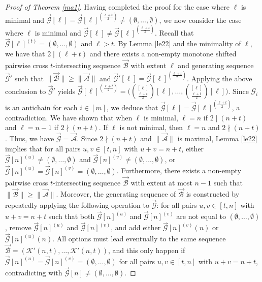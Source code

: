 \documentclass[11pt,a4paper]{article}
\begin{document}
\begin{proof}[Proof of Theorem \ref{ma1}]
Having completed the proof for the case where $\ell$ is minimal and $\vec{\mathcal{G}}[\ell]= \vec{\mathcal{G}}[\ell]^{(\frac{\ell+t}{2})}\neq (\emptyset,\ldots,\emptyset)$, we now consider the case where $\ell$ is minimal and $\vec{\mathcal{G}}[\ell]\neq \vec{\mathcal{G}}[\ell]^{(\frac{\ell+t}{2})}$.
Recall that $\vec{\mathcal{G}}[\ell]^{(t)}=(\emptyset,\ldots,\emptyset)$ and $\ell>t$. 
By Lemma \ref{le22} and the minimality of $\ell$, we have that $2\mid (\ell+t)$ and 
there exists a non-empty monotone shifted pairwise cross $t$-intersecting sequence $\vec{\mathcal{B}}$  with  extent $\ell$ and 
generating sequence $\vec{\mathcal{G}}'$ 
such that $\|\vec{\mathcal{B}}\|\geq \|\vec{\mathcal{A}}\|$ and $\vec{\mathcal{G}}'[\ell]= \vec{\mathcal{G}}[\ell]^{(\frac{\ell+t}{2})}$.
Applying the above conclusion to  $\vec{\mathcal{G}}'$ yields 
$\vec{\mathcal{G}}[\ell]^{(\frac{\ell+t}{2})}=\Big(\binom{[\ell]}{\frac{\ell+t}{2}}[\ell], \ldots,\binom{[\ell]}{\frac{\ell+t}{2}}[\ell] \Big)$.
Since $\mathcal{G}_i$ is an antichain for each $i\in [m]$, we deduce that $\vec{\mathcal{G}}[\ell]= \vec{\mathcal{G}}[\ell]^{(\frac{\ell+t}{2})}$, a contradiction.
We have shown that  when $\ell$ is minimal, $\ell=n$ if $2\mid (n+t)$ and $\ell=n-1$ if $2\nmid (n+t)$.
If $\ell$ is not minimal, then $\ell=n$ and $2\nmid (n+t)$.
Thus, we have $ \vec{\mathcal{G}}= \vec{\mathcal{A}}$.
Since $2\nmid (n+t)$ and $\|\vec{\mathcal{A}}\|$ is maximal, 
 Lemma \ref{le22} implies that  for all pairs $u, v\in [t,n]$ with  $u+v=n+t$, either $\vec{\mathcal{G}}[n]^{(u)}\neq (\emptyset,\ldots, \emptyset)$ and $\vec{\mathcal{G}}[n]^{(v)}\neq (\emptyset,\ldots, \emptyset)$, or $\vec{\mathcal{G}}[n]^{(u)}=\vec{\mathcal{G}}[n]^{(v)}=(\emptyset,\ldots, \emptyset)$. Furthermore, there exists a non-empty pairwise cross $t$-intersecting sequence $\vec{\mathcal{B}}$  with extent at most $n-1$  such that $\|\vec{\mathcal{B}}\|\geq \|\vec{\mathcal{A}}\|$.
Moreover,  the generating sequence of  $\vec{\mathcal{B}}$ is constructed by repeatedly applying the following operation to $\vec{\mathcal{G}}$: 
for all pairs 
 $u, v\in [t,n]$ with  $u+v=n+t$ such that both $\vec{\mathcal{G}}[n]^{(u)}$ and $\vec{\mathcal{G}}[n]^{(v)}$ are  not equal to  $(\emptyset,\ldots, \emptyset)$, remove $\vec{\mathcal{G}}[n]^{(u)}$ and $ \vec{\mathcal{G}}[n]^{(v)}$, and add either $\vec{\mathcal{G}}[n]^{(v)}(n)$ or $\vec{\mathcal{G}}[n]^{(u)}(n)$.
All options must lead eventually to the same  sequence $\vec{\mathcal{B}}=(\mathcal{K}'(n,t), \ldots, \mathcal{K}'(n,t))$, and this only happen if $\vec{\mathcal{G}}[n]^{(u)}=\vec{\mathcal{G}}[n]^{(v)}=(\emptyset,\ldots, \emptyset)$ for all pairs 
 $u, v\in [t,n]$ with  $u+v=n+t$, contradicting with $\vec{\mathcal{G}}[n]\neq (\emptyset,\ldots, \emptyset)$.
\end{proof}
\end{document}

